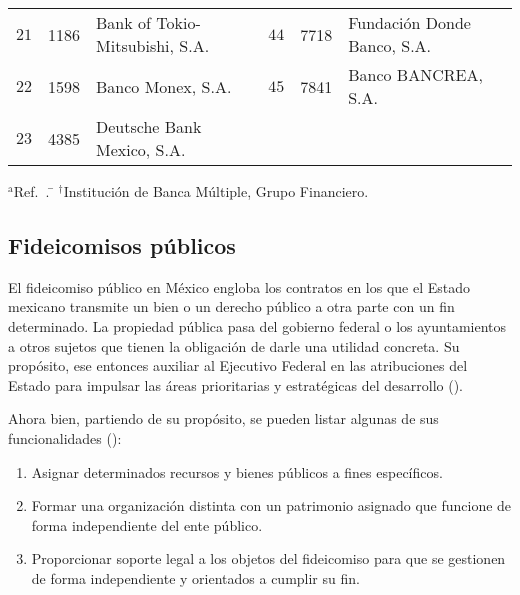 \documentclass[preprint,floatfix] {revtex4}
\begin{document}
\begin{table}[h]
\begin{ruledtabular}
\begin{tabular}{llllll}
                            \\
                            $21$ &  1186  &   Bank of Tokio-Mitsubishi, S.A. &
                            $44$ &  7718  &   Fundación Donde Banco, S.A. 
                            \\
                            $22$ &  1598  &   Banco Monex, S.A. &
                            $45$ &  7841  &   Banco BANCREA, S.A. 
                            \\
                            $23$ &  4385  &   Deutsche Bank Mexico, S.A.
                        \end{tabular}
                    \end{ruledtabular}
                    \begin{tabbing}
                        $^{\mathrm{a}}$Ref.~\cite{cnbv-bm}. \hspace{25pt} \= 
                        $^\dag$Institución de Banca Múltiple, Grupo Financiero.
                    \end{tabbing}
                \end{table}
            \endgroup
        \subsection{Fideicomisos públicos}
            El fideicomiso público en México engloba los contratos en los que el Estado mexicano transmite un bien o un derecho público a otra parte con un fin determinado. La propiedad pública pasa del gobierno federal o los ayuntamientos a otros sujetos que tienen la obligación de darle una utilidad concreta. Su propósito, ese entonces auxiliar al Ejecutivo Federal en las atribuciones del Estado para impulsar las áreas prioritarias y estratégicas del desarrollo (\cite{fideicomisos-sarahi}).
            
            Ahora bien, partiendo de su propósito, se pueden listar algunas de sus funcionalidades (\cite{fideicomisopublico-victoria}):
            
            \begin{enumerate}
                \item Asignar determinados recursos y bienes públicos a fines específicos.
                \item Formar una organización distinta con un patrimonio asignado que funcione de forma independiente del ente público. 
                \item Proporcionar soporte legal a los objetos del fideicomiso para que se gestionen de forma independiente y orientados a cumplir su fin. 
            \end{enumerate}
            
\end{document}
